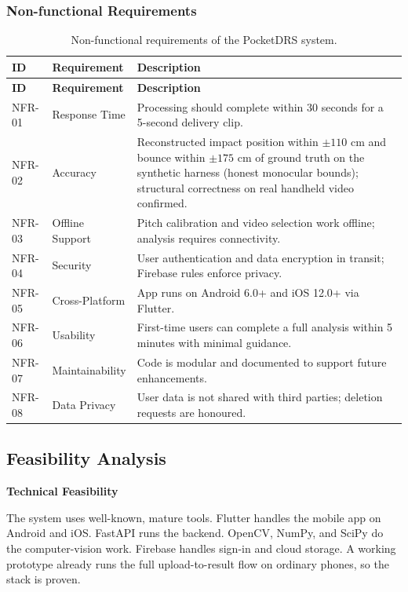 \documentclass[12pt,a4paper]{report}
\begin{document}
\subsubsection{Non-functional Requirements}

\begin{longtable}{|p{1.5cm}|p{3.8cm}|p{7.0cm}|}
\caption{Non-functional requirements of the PocketDRS system.}\\
\hline
\textbf{ID} & \textbf{Requirement} & \textbf{Description} \\
\hline
\endfirsthead
\hline
\textbf{ID} & \textbf{Requirement} & \textbf{Description} \\
\hline
\endhead
NFR-01 & Response Time & Processing should complete within 30 seconds for a 5-second delivery clip. \\
\hline
NFR-02 & Accuracy & Reconstructed impact position within $\pm 110$ cm and bounce within $\pm 175$ cm of ground truth on the synthetic harness (honest monocular bounds); structural correctness on real handheld video confirmed. \\
\hline
NFR-03 & Offline Support & Pitch calibration and video selection work offline; analysis requires connectivity. \\
\hline
NFR-04 & Security & User authentication and data encryption in transit; Firebase rules enforce privacy. \\
\hline
NFR-05 & Cross-Platform & App runs on Android 6.0+ and iOS 12.0+ via Flutter. \\
\hline
NFR-06 & Usability & First-time users can complete a full analysis within 5 minutes with minimal guidance. \\
\hline
NFR-07 & Maintainability & Code is modular and documented to support future enhancements. \\
\hline
NFR-08 & Data Privacy & User data is not shared with third parties; deletion requests are honoured. \\
\hline
\end{longtable}

\subsection{Feasibility Analysis}

\textbf{Technical Feasibility}

The system uses well-known, mature tools. Flutter handles the mobile app on Android and iOS. FastAPI runs the backend. OpenCV, NumPy, and SciPy do the computer-vision work. Firebase handles sign-in and cloud storage. A working prototype already runs the full upload-to-result flow on ordinary phones, so the stack is proven.
\end{document}
